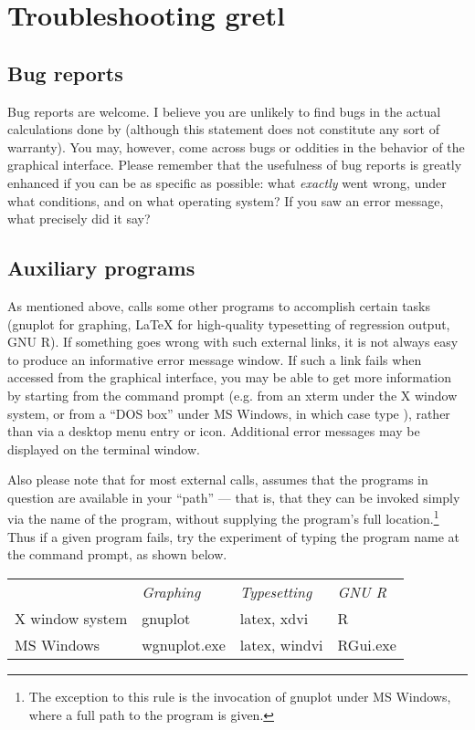 \chapter{Troubleshooting gretl}
\label{trouble}

\section{Bug reports}
\label{trouble-bugs}

Bug reports are welcome. I believe you are unlikely to find bugs in
the actual calculations done by  (although this statement
does not constitute any sort of warranty). You may, however, come
across bugs or oddities in the behavior of the graphical interface.
Please remember that the usefulness of bug reports is greatly enhanced
if you can be as specific as possible: what \emph{exactly} went wrong,
under what conditions, and on what operating system?  If you saw an
error message, what precisely did it say?

\section{Auxiliary programs}
\label{trouble-programs}

As mentioned above,  calls some other programs to
accomplish certain tasks (gnuplot for graphing, {\LaTeX} for
high-quality typesetting of regression output, GNU R).  If something
goes wrong with such external links, it is not always easy to produce
an informative error message window.  If such a link fails when
accessed from the  graphical interface, you may be able to
get more information by starting  from the command prompt
(e.g.  from an xterm under the X window system, or from a ``DOS box''
under MS Windows, in which case type ), rather than
via a desktop menu entry or icon.  Additional error messages may be
displayed on the terminal window.  

Also please note that for most external calls,  assumes
that the programs in question are available in your ``path'' --- that
is, that they can be invoked simply via the name of the program,
without supplying the program's full location.\footnote{The exception
  to this rule is the invocation of gnuplot under MS Windows, where a
  full path to the program is given.}  Thus if a given program fails,
try the experiment of typing the program name at the command prompt,
as shown below.

\begin{center}
  \begin{tabular}{llll}
    & \textit{Graphing} & \textit{Typesetting} & \textit{GNU R}\\
    X window system & gnuplot & latex, xdvi & R\\
    MS Windows & wgnuplot.exe & latex, windvi & RGui.exe\\
  \end{tabular}
\end{center}


